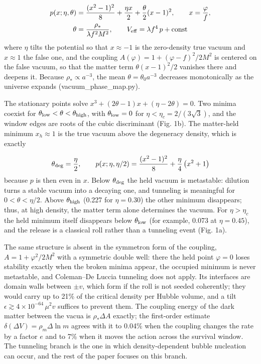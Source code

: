 \documentclass[preprint,12pt]{elsarticle}
\begin{document}
\begin{equation}\begin{gathered}
p(x;\eta,\theta)=\frac{(x^2-1)^2}{8}+\frac{\eta x}{2}+\frac{\theta}{2}(x-1)^2,\qquad x=\frac{\varphi}{f},\\
\theta=\frac{\rho_*}{\lambda f^2M^2},\qquad V_{\rm eff}=\lambda f^4\,p+{\rm const}
\end{gathered}\end{equation}
where $\eta$ tilts the potential so that $x\approx-1$ is the zero-density true vacuum and $x\approx1$ the false one, and the coupling $A(\varphi)=1+(\varphi-f)^2/2M^2$ is centered on the false vacuum, so that the matter term $\theta(x-1)^2/2$ vanishes there and deepens it. Because $\rho_*\propto a^{-3}$, the mean $\theta=\theta_0a^{-3}$ decreases monotonically as the universe expands (vacuum\_phase\_map.py).

The stationary points solve $x^3+(2\theta-1)x+(\eta-2\theta)=0$. Two minima coexist for $\theta_{\rm low}<\theta<\theta_{\rm high}$, with $\theta_{\rm low}=0$ for $\eta<\eta_c=2/(3\sqrt3)$, and the window edges are roots of the cubic discriminant (Fig. 1b). The matter-held minimum $x_h\approx1$ is the true vacuum above the degeneracy density, which is exactly

\begin{equation}
\theta_{\rm deg}=\frac{\eta}{2},\qquad p(x;\eta,\eta/2)=\frac{(x^2-1)^2}{8}+\frac{\eta}{4}\left(x^2+1\right)
\end{equation}
because $p$ is then even in $x$. Below $\theta_{\rm deg}$ the held vacuum is metastable: dilution turns a stable vacuum into a decaying one, and tunneling is meaningful for $0<\theta<\eta/2$. Above $\theta_{\rm high}$ (0.227 for $\eta=0.30$) the other minimum disappears; thus, at high density, the matter term alone determines the vacuum. For $\eta>\eta_c$ the held minimum itself disappears below $\theta_{\rm low}$ (for example, 0.073 at $\eta=0.45$), and the release is a classical roll rather than a tunneling event (Fig. 1a).

The same structure is absent in the symmetron form of the coupling, $A=1+\varphi^2/2M^2$ with a symmetric double well: there the held point $\varphi=0$ loses stability exactly when the broken minima appear, the occupied minimum is never metastable, and Coleman--De Luccia tunneling does not apply. Its interfaces are domain walls between $\pm v$, which form if the roll is not seeded coherently; they would carry up to 21\% of the critical density per Hubble volume, and a tilt $\epsilon\gtrsim4\times10^{-64}\,\mu^2v$ suffices to prevent them. The coupling energy of the dark matter between the vacua is $\rho_*\Delta A$ exactly; the first-order estimate $\delta(\Delta V)=\rho_m\Delta\ln m$ agrees with it to 0.04\% when the coupling changes the rate by a factor $e$ and to 7\% when it moves the action across the survival window. The tunneling branch is the one in which density-dependent bubble nucleation can occur, and the rest of the paper focuses on this branch.
\end{document}
